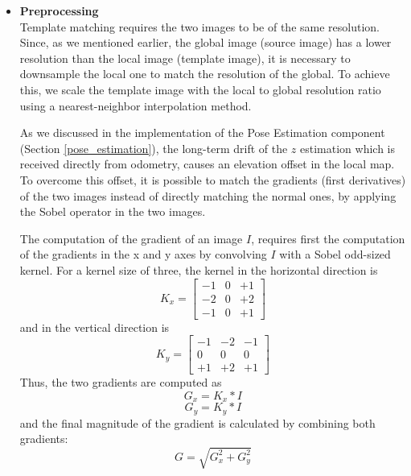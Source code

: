 \begin{itemize}
    \item \textbf{Preprocessing} \\
        Template matching requires the two images to be of the same
        resolution.
        Since, as we mentioned earlier, the global image (source image) has a
        lower resolution than the local image (template image),
        it is necessary to downsample the local one to match the resolution
        of the global.
        To achieve this, we scale the template image with the local to global
        resolution ratio using a nearest-neighbor interpolation method.

        As we discussed in the implementation of the Pose Estimation component
        (Section \ref{pose_estimation}), the long-term drift of the $z$
        estimation which is received directly from odometry, causes an
        elevation offset in the local map.
        To overcome this offset, it is possible to match the gradients
        (first derivatives) of the two images instead of directly matching
        the normal ones, by applying the Sobel operator in the two images.

        The computation of the gradient of an image $I$, requires first the
        computation of the gradients in the x and y axes by convolving $I$
        with a Sobel odd-sized kernel. For a kernel size of
        three, the kernel in the horizontal direction is
        \begin{equation}
            K_x =
            \begin{bmatrix}
                -1 & 0 & +1 \\
                -2 & 0 & +2 \\
                -1 & 0 & +1
            \end{bmatrix}
        \end{equation}
        and in the vertical direction is
        \begin{equation}
            K_y =
            \begin{bmatrix}
                -1 & -2 & -1 \\
                0 & 0 & 0 \\
                +1 & +2 & +1
            \end{bmatrix}
        \end{equation}
        Thus, the two gradients are computed as
        \begin{equation}
            G_x = K_x * I
        \end{equation}
        \begin{equation}
            G_y = K_y * I
        \end{equation}
        and the final magnitude of the gradient is calculated by
        combining both gradients:
        \begin{equation}
            G = \sqrt{G_x^2 + G_y^2}
        \end{equation}


\end{itemize}
